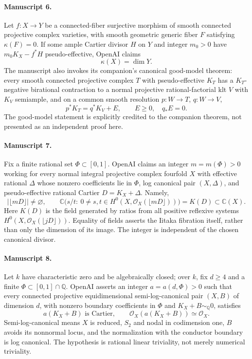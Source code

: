 \documentclass[11pt]{article}
\begin{document}
\paragraph{Manuscript 6.}
Let $f:X\to Y$ be a connected-fiber surjective morphism of smooth connected projective complex varieties, with smooth geometric generic fiber $F$ satisfying $\kappa(F)=0$. If some ample Cartier divisor $H$ on $Y$ and integer $m_0>0$ have $m_0K_X-f^*H$ pseudo-effective, OpenAI claims
\[
\kappa(X)=\dim Y.
\]
The manuscript also invokes its companion's canonical good-model theorem: every smooth connected projective complex $T$ with pseudo-effective $K_T$ has a $K_T$-negative birational contraction to a normal projective rational-factorial klt $V$ with $K_V$ semiample, and on a common smooth resolution $p:W\to T$, $q:W\to V$,
\[
p^*K_T=q^*K_V+E,\qquad E\ge0,\quad q_*E=0.
\]
The good-model statement is explicitly credited to the companion theorem, not presented as an independent proof here.

\paragraph{Manuscript 7.}
Fix a finite rational set $\Phi\subset[0,1]$. OpenAI claims an integer $m=m(\Phi)>0$ working for every normal integral projective complex fourfold $X$ with effective rational $\Delta$ whose nonzero coefficients lie in $\Phi$, log canonical pair $(X,\Delta)$, and pseudo-effective rational Cartier $D=K_X+\Delta$. Namely,
\[
|\lfloor mD\rfloor|\ne\varnothing,\qquad
\mathbb C\bigl(s/t:\ 0\ne s,t\in H^0(X,\mathcal O_X(\lfloor mD\rfloor))\bigr)=K(D)\subset\mathbb C(X).
\]
Here $K(D)$ is the field generated by ratios from all positive reflexive systems $H^0(X,\mathcal O_X(\lfloor jD\rfloor))$. Equality of fields asserts the Iitaka fibration itself, rather than only the dimension of its image. The integer is independent of the chosen canonical divisor.

\paragraph{Manuscript 8.}
Let $k$ have characteristic zero and be algebraically closed; over $k$, fix $d\ge4$ and a finite $\Phi\subset[0,1]\cap\mathbb Q$. OpenAI asserts an integer $a=a(d,\Phi)>0$ such that every connected projective equidimensional semi-log-canonical pair $(X,B)$ of dimension $d$, with nonzero boundary coefficients in $\Phi$ and $K_X+B\sim_{\mathbb Q}0$, satisfies
\[
a(K_X+B)\text{ is Cartier},\qquad \mathcal O_X(a(K_X+B))\simeq\mathcal O_X.
\]
Semi-log-canonical means $X$ is reduced, $S_2$ and nodal in codimension one, $B$ avoids its nonnormal locus, and the normalization with the conductor boundary is log canonical. The hypothesis is rational linear triviality, not merely numerical triviality.
\end{document}
